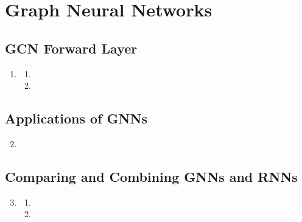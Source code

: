 \documentclass{article}
\begin{document}
\section{Graph Neural Networks}

\subsection{GCN Forward Layer}

\begin{enumerate}[label=\textbf{3.\arabic*}]
  \item

  \begin{enumerate}[label=\textbf{(\alph*)}]
    \item
    \item
  \end{enumerate}
\end{enumerate}

\subsection{Applications of GNNs}

\begin{enumerate}[label=\textbf{3.\arabic*}]
  \setcounter{enumi}{1}
  \item
\end{enumerate}

\subsection{Comparing and Combining GNNs and RNNs}

\begin{enumerate}[label=\textbf{3.\arabic*}]
  \setcounter{enumi}{2}
  \item

  \begin{enumerate}[label=\textbf{(\alph*)}]
    \item
    \item
  \end{enumerate}
\end{enumerate}

\end{document}
